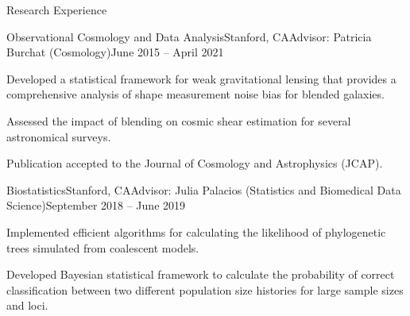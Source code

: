 \documentclass{resume} %
\begin{document}
\begin{rSection}{Research Experience}
\begin{rSubsection}{Observational Cosmology and Data Analysis}{Stanford, CA}{Advisor: Patricia Burchat (Cosmology)}{June 2015 -- April 2021}
\item Developed a statistical framework for weak gravitational lensing that provides a comprehensive analysis of shape measurement noise bias for blended galaxies.
\item Assessed the impact of blending on cosmic shear estimation for several astronomical surveys.
\item Publication accepted to the Journal of Cosmology and Astrophysics (JCAP). 
\end{rSubsection}

\begin{rSubsection}{Biostatistics}{Stanford, CA}{Advisor: Julia Palacios (Statistics and Biomedical Data Science)}{September 2018 -- June 2019}
\item Implemented efficient algorithms for calculating the likelihood of phylogenetic trees simulated from coalescent models.

\item Developed Bayesian statistical framework to calculate the probability of correct classification between two different population size histories for large sample sizes and loci. 


\end{rSubsection}


\end{rSection}
\end{document}
